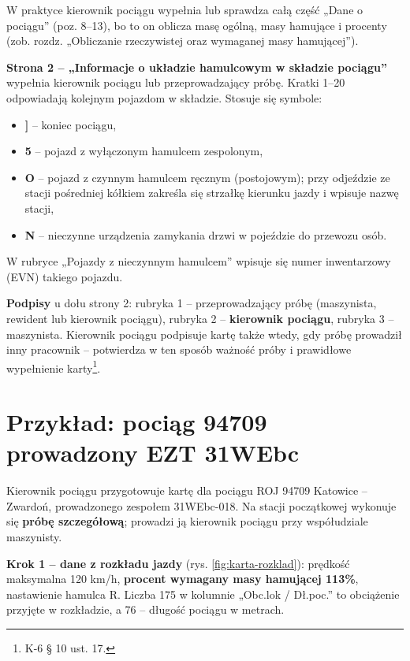 W praktyce kierownik pociągu wypełnia lub sprawdza całą część „Dane o pociągu” (poz. 8–13), bo to on oblicza masę ogólną, masy hamujące i procenty (zob. rozdz. „Obliczanie rzeczywistej oraz wymaganej masy hamującej”).

\textbf{Strona 2 – „Informacje o układzie hamulcowym w składzie pociągu”} wypełnia kierownik pociągu lub przeprowadzający próbę. Kratki 1–20 odpowiadają kolejnym pojazdom w składzie. Stosuje się symbole:
\begin{itemize}
	\item \textbf{]} – koniec pociągu,
	\item \textbf{5} – pojazd z wyłączonym hamulcem zespolonym,
	\item \textbf{O} – pojazd z czynnym hamulcem ręcznym (postojowym); przy odjeździe ze stacji pośredniej kółkiem zakreśla się strzałkę kierunku jazdy i wpisuje nazwę stacji,
	\item \textbf{N} – nieczynne urządzenia zamykania drzwi w pojeździe do przewozu osób.
\end{itemize}
W rubryce „Pojazdy z nieczynnym hamulcem” wpisuje się numer inwentarzowy (EVN) takiego pojazdu.

\textbf{Podpisy} u dołu strony 2: rubryka 1 – przeprowadzający próbę (maszynista, rewident lub kierownik pociągu), rubryka 2 – \textbf{kierownik pociągu}, rubryka 3 – maszynista. Kierownik pociągu podpisuje kartę także wtedy, gdy próbę prowadził inny pracownik – potwierdza w ten sposób ważność próby i prawidłowe wypełnienie karty\footnote{K-6 § 10 ust. 17.}.

\section{Przykład: pociąg 94709 prowadzony EZT 31WEbc}

Kierownik pociągu przygotowuje kartę dla pociągu ROJ 94709 Katowice – Zwardoń, prowadzonego zespołem 31WEbc-018. Na stacji początkowej wykonuje się \textbf{próbę szczegółową}; prowadzi ją kierownik pociągu przy współudziale maszynisty.

\textbf{Krok 1 – dane z rozkładu jazdy} (rys. \ref{fig:karta-rozklad}): prędkość maksymalna 120 km/h, \textbf{procent wymagany masy hamującej 113\%}, nastawienie hamulca R. Liczba 175 w kolumnie „Obc.lok / Dł.poc.” to obciążenie przyjęte w rozkładzie, a 76 – długość pociągu w metrach.


